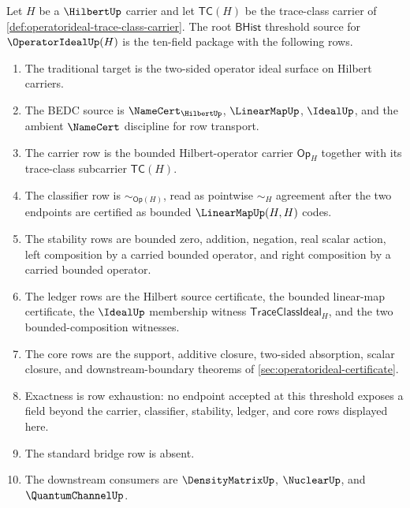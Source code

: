 \begin{definition}
\label{def:operatorideal-root-bhist-threshold-source}
Let $H$ be a $\HilbertUp$ carrier and let $\mathsf{TC}(H)$ be the trace-class carrier of \autoref{def:operatorideal-trace-class-carrier}. The root $\mathsf{BHist}$ threshold source for $\OperatorIdealUp(H)$ is the ten-field package with the following rows.
\begin{enumerate}
\item The traditional target is the two-sided operator ideal surface on Hilbert carriers.
\item The BEDC source is $\NameCert_{\HilbertUp}$, $\LinearMapUp$, $\IdealUp$, and the ambient $\NameCert$ discipline for row transport.
\item The carrier row is the bounded Hilbert-operator carrier $\mathsf{Op}_H$ together with its trace-class subcarrier $\mathsf{TC}(H)$.
\item The classifier row is $\sim_{\mathsf{Op}(H)}$, read as pointwise $\sim_H$ agreement after the two endpoints are certified as bounded $\LinearMapUp(H,H)$ codes.
\item The stability rows are bounded zero, addition, negation, real scalar action, left composition by a carried bounded operator, and right composition by a carried bounded operator.
\item The ledger rows are the Hilbert source certificate, the bounded linear-map certificate, the $\IdealUp$ membership witness $\mathsf{TraceClassIdeal}_H$, and the two bounded-composition witnesses.
\item The core rows are the support, additive closure, two-sided absorption, scalar closure, and downstream-boundary theorems of \autoref{sec:operatorideal-certificate}.
\item Exactness is row exhaustion: no endpoint accepted at this threshold exposes a field beyond the carrier, classifier, stability, ledger, and core rows displayed here.
\item The standard bridge row is absent.
\item The downstream consumers are $\DensityMatrixUp$, $\NuclearUp$, and $\QuantumChannelUp$.
\end{enumerate}
\end{definition}

